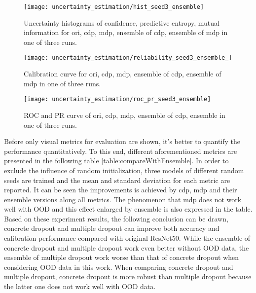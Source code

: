 \begin{figure}[H]
	\begin{center}
		\texttt{[image: uncertainty\_estimation/hist\_seed3\_ensemble]}
		\caption{Uncertainty histograms of confidence, predictive entropy, mutual information for ori, cdp, mdp, ensemble of cdp, ensemble of mdp in one of three runs.}		
		\label{exp2_histo}
	\end{center}
\end{figure}

\begin{figure}[H]
	\begin{center}
		\texttt{[image: uncertainty\_estimation/reliability\_seed3\_ensemble\_]}
		\caption{Calibration curve for ori, cdp, mdp, ensemble of cdp, ensemble of mdp in one of three runs.}		
		\label{exp2_reliability}
	\end{center}
\end{figure}

\begin{figure}[H]
	\begin{center}
		\texttt{[image: uncertainty\_estimation/roc\_pr\_seed3\_ensemble]}
		\caption{ROC and PR curve of ori, cdp, mdp, ensemble of cdp, ensemble in one of three runs.}		
		\label{exp2_roc_pr}
	\end{center} 
\end{figure}

Before only visual metrics for evaluation are shown, it's better to quantify the performance quantitatively. To this end, different aforementioned metrics are presented in the following table \ref{table:compareWithEnsemble}. In order to exclude the influence of random initialization, three models of different random seeds are trained and the mean and standard deviation for each metric are reported. It can be seen the improvements is achieved by cdp, mdp and their ensemble versions along all metrics. The phenomenon that mdp does not work well with OOD and this effect enlarged by ensemble is also expressed in the table. Based on these experiment results, the following conclusion can be drawn, concrete dropout and multiple dropout can improve both accuracy and calibration performance compared with original ResNet50. While the ensemble of concrete dropout and multiple dropout work even better without OOD data, the ensemble of multiple dropout work worse than that of concrete dropout when considering OOD data in this work. When comparing concrete dropout and multiple dropout, concrete dropout is more robust than multiple dropout because the latter one does not work well with OOD data.

